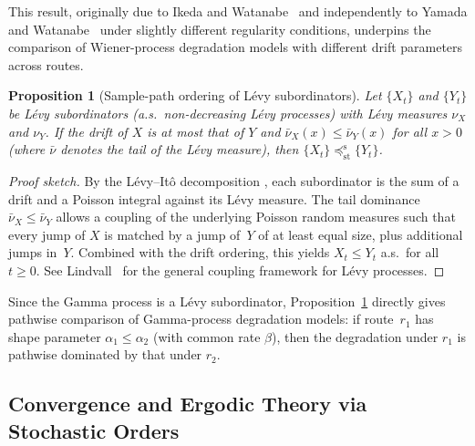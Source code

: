 \documentclass[11pt,a4paper]{article}
\theoremstyle{plain}
\newtheorem{proposition}[theorem]{Proposition}
\theoremstyle{definition}
\theoremstyle{remark}
\begin{document}
This result, originally due to Ikeda and Watanabe~\cite{ikeda1977} and
independently to Yamada and Watanabe~\cite{yamadawatanabe1971} under slightly
different regularity conditions, underpins the comparison of Wiener-process
degradation models with different drift parameters across routes.


\begin{proposition}[Sample-path ordering of L\'evy subordinators]
\label{prop:subordinator}
Let $\{X_t\}$ and $\{Y_t\}$ be L\'evy subordinators (a.s.\ non-decreasing L\'evy
processes) with L\'evy measures $\nu_X$ and $\nu_Y$.  If the drift of $X$ is at most
that of $Y$ and $\bar{\nu}_X(x) \leq \bar{\nu}_Y(x)$ for all $x > 0$ (where
$\bar{\nu}$ denotes the tail of the L\'evy measure), then
$\{X_t\} \preceq_{\mathrm{st}}^{\mathrm{s}} \{Y_t\}$.
\end{proposition}
\begin{proof}[Proof sketch]
By the L\'evy--It\^o decomposition \cite[Thm.~19.2]{sato1999}, each subordinator is
the sum of a drift and a Poisson integral against its L\'evy measure.  The tail
dominance $\bar{\nu}_X \leq \bar{\nu}_Y$ allows a coupling of the underlying
Poisson random measures such that every jump of $X$ is matched by a jump of~$Y$
of at least equal size, plus additional jumps in~$Y$.  Combined with the drift
ordering, this yields $X_t \leq Y_t$ a.s.\ for all $t \geq 0$.  See
Lindvall~\cite{lindvall2002} for the general coupling framework for L\'evy
processes.
\end{proof}

Since the Gamma process is a L\'evy subordinator, Proposition~\ref{prop:subordinator}
directly gives pathwise comparison of Gamma-process degradation models: if route~$r_1$
has shape parameter $\alpha_1 \leq \alpha_2$ (with common rate $\beta$), then the
degradation under $r_1$ is pathwise dominated by that under $r_2$.

\subsection{Convergence and Ergodic Theory via Stochastic Orders}
\label{sec:micro:ergodic}
\end{document}
